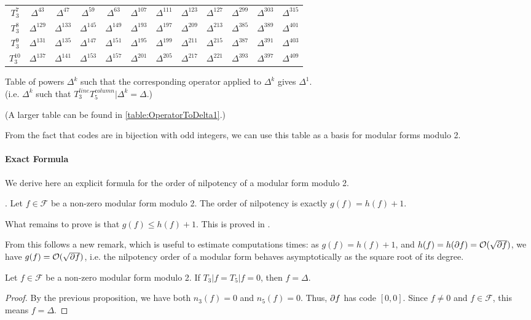 \begin{center}
\begin{tabular}{|c||ccccccccccc|}
		$T_3^{7}$ & $\Delta^{43}$ & $\Delta^{47}$ & $\Delta^{59}$ & $\Delta^{63}$ & $\Delta^{107}$ & $\Delta^{111}$ & $\Delta^{123}$ & $\Delta^{127}$ & $\Delta^{299}$ & $\Delta^{303}$ & $\Delta^{315}$ \\
		$T_3^{8}$ & $\Delta^{129}$ & $\Delta^{133}$ & $\Delta^{145}$ & $\Delta^{149}$ & $\Delta^{193}$ & $\Delta^{197}$ & $\Delta^{209}$ & $\Delta^{213}$ & $\Delta^{385}$ & $\Delta^{389}$ & $\Delta^{401}$ \\
		$T_3^{9}$ & $\Delta^{131}$ & $\Delta^{135}$ & $\Delta^{147}$ & $\Delta^{151}$ & $\Delta^{195}$ & $\Delta^{199}$ & $\Delta^{211}$ & $\Delta^{215}$ & $\Delta^{387}$ & $\Delta^{391}$ & $\Delta^{403}$ \\
		$T_3^{10}$ & $\Delta^{137}$ & $\Delta^{141}$ & $\Delta^{153}$ & $\Delta^{157}$ & $\Delta^{201}$ & $\Delta^{205}$ & $\Delta^{217}$ & $\Delta^{221}$ & $\Delta^{393}$ & $\Delta^{397}$ & $\Delta^{409}$ \\
		\hline
	\end{tabular}

	Table of powers $\Delta^k$ such that the corresponding operator applied to $\Delta^k$ gives $\Delta^1$.\\
	(i.e. $\Delta^k$ such that $T_3^{line}T_5^{column}|\Delta^k = \Delta$.)
\end{center}
(A larger table can be found in \ref{table:OperatorToDelta1}.)

From the fact that codes are in bijection with odd integers, we can use this table as a basis for modular forms modulo 2.


\paragraph{Exact Formula}
We derive here an explicit formula for the order of nilpotency of a modular form modulo 2.
\label{theoremOrderOfNilpotency}
\begin{theorem} \cite[§5]{OrdreNilpotenceOperateurHecke}.
	Let $f \in \mathcal{F}$ be a non-zero modular form modulo 2.
	The order of nilpotency is exactly $g(f) = h(f) + 1$.
\end{theorem}
What remains to prove is that $g(f) \leq h(f) + 1$.
This is proved in \cite[§5]{OrdreNilpotenceOperateurHecke}.

From this follows a new remark, which is useful to estimate computations times:
as $g(f)=h(f)+1$, and $h(f) = h(\partial f) = \mathcal{O}(\sqrt{\partial f})$, we have $g(f) = \mathcal{O}(\sqrt{\partial f})$, i.e. the nilpotency order of a modular form behaves asymptotically as the square root of its degree.

\label{corollaryOrderOfNilpotency}
\begin{corollary}
	Let $f \in \mathcal{F}$ be a non-zero modular form modulo 2.
	If $T_3|f = T_5|f = 0$, then $f = \Delta$.
\end{corollary}
\begin{proof}
	By the previous proposition, we have both $n_3(f)=0$ and $n_5(f)=0$.
	Thus, $\partial f$ has code $\left[ 0,0 \right]$.
	Since $f \neq 0$ and $f \in \mathcal{F}$, this means $f = \Delta$.
\end{proof}
